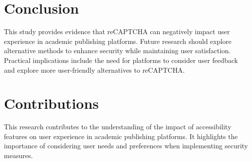 \documentclass{article}
\begin{document}
\section{Conclusion}
This study provides evidence that reCAPTCHA can negatively impact user experience in academic publishing platforms. Future research should explore alternative methods to enhance security while maintaining user satisfaction. Practical implications include the need for platforms to consider user feedback and explore more user-friendly alternatives to reCAPTCHA.

\section{Contributions}
This research contributes to the understanding of the impact of accessibility features on user experience in academic publishing platforms. It highlights the importance of considering user needs and preferences when implementing security measures.
\end{document}
